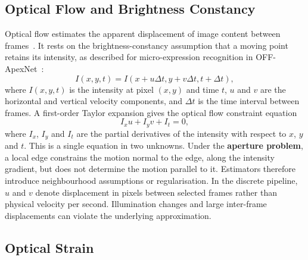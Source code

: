\subsection{Optical Flow and Brightness Constancy}
\label{sec:optical-flow}

Optical flow estimates the apparent displacement of image content between frames~\cite{horn1981}. It rests on the brightness-constancy assumption that a moving point retains its intensity, as described for micro-expression recognition in OFF-ApexNet~\cite{liong2019a}:
\begin{equation}
	I(x,y,t)=I(x+u\Delta t,y+v\Delta t,t+\Delta t),
	\label{eq:brightness-constancy}
\end{equation}
where $I(x,y,t)$ is the intensity at pixel $(x,y)$ and time $t$, $u$ and $v$ are the horizontal and vertical velocity components, and $\Delta t$ is the time interval between frames. A first-order Taylor expansion gives the optical flow constraint equation~\cite{horn1981}
\begin{equation}
	I_xu+I_yv+I_t=0,
	\label{eq:flow-constraint}
\end{equation}
where $I_x$, $I_y$ and $I_t$ are the partial derivatives of the intensity with respect to $x$, $y$ and $t$. This is a single equation in two unknowns. Under the \textbf{aperture problem}, a local edge constrains the motion normal to the edge, along the intensity gradient, but does not determine the motion parallel to it. Estimators therefore introduce neighbourhood assumptions or regularisation. In the discrete pipeline, $u$ and $v$ denote displacement in pixels between selected frames rather than physical velocity per second. Illumination changes and large inter-frame displacements can violate the underlying approximation.

\subsection{Optical Strain}
\label{sec:optical-strain}

